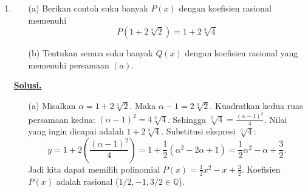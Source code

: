 \documentclass[12pt,twoside]{article}
\newenvironment{solution}
{
	\par\noindent\textbf{\underline{Solusi.}}\\
}
{
	\par
}
\begin{document}
\begin{enumerate}
\begin{solution}
\begin{enumerate}
            \item[(b)] Kita diminta memberi contoh $M, N$ ukuran $3 \times 3$ yang nilai eigennya positif, dan $MN$ juga punya nilai eigen positif.
                  Cara termudah adalah memilih $M$ dan $N$ sebagai matriks diagonal dengan elemen positif.
                  Misal $M = \text{diag}(1, 2, 3)$ dan $N = \text{diag}(4, 5, 6)$.
                  Nilai eigen $M$: $1, 2, 3$ (positif).
                  Nilai eigen $N$: $4, 5, 6$ (positif).
                  $MN = \text{diag}(4, 10, 18)$.
                  Nilai eigen $MN$: $4, 10, 18$ (positif).
                  Contoh non-diagonal (agar tidak trivial):
                  Misalkan $M = I = \begin{pmatrix} 1 & 0 & 0 \\ 0 & 1 & 0 \\ 0 & 0 & 1 \end{pmatrix}$. Nilai eigen 1, 1, 1.
                  Misalkan $N = \begin{pmatrix} 2 & 1 & 0 \\ 0 & 2 & 1 \\ 0 & 0 & 2 \end{pmatrix}$ (Matriks segitiga atas).
                  Nilai eigen $N$ adalah diagonalnya: 2, 2, 2 (positif).
                  Maka $MN = N$. Nilai eigen 2, 2, 2 (positif).
          \end{enumerate}
        \end{solution}

  \item \begin{enumerate}
          \item [(a)] Berikan contoh suku banyak $P(x)$ dengan koefisien rasional memenuhi
                $$P(1+2\sqrt[3]{2})=1+2\sqrt[3]{4}$$
          \item[(b)] Tentukan semua suku banyak $Q(x)$ dengan koefisien rasional yang memenuhi persamaan $(a)$.
        \end{enumerate}
        \begin{solution}
          \begin{enumerate}
            \item[(a)] Misalkan $\alpha = 1 + 2\sqrt[3]{2}$. Maka $\alpha - 1 = 2\sqrt[3]{2}$.
                  Kuadratkan kedua ruas persamaan kedua:
                  $(\alpha-1)^2 = 4 \sqrt[3]{4}$.
                  Sehingga $\sqrt[3]{4} = \frac{(\alpha-1)^2}{4}$.
                  Nilai yang ingin dicapai adalah $1 + 2\sqrt[3]{4}$. Substitusi ekspresi $\sqrt[3]{4}$:
                  $$ y = 1 + 2 \left( \frac{(\alpha-1)^2}{4} \right) = 1 + \frac{1}{2}(\alpha^2 - 2\alpha + 1) = \frac{1}{2}\alpha^2 - \alpha + \frac{3}{2}. $$
                  Jadi kita dapat memilih polinomial $P(x) = \frac{1}{2}x^2 - x + \frac{3}{2}$.
                  Koefisien $P(x)$ adalah rasional ($1/2, -1, 3/2 \in \mathbb{Q}$).


\end{enumerate}
\end{solution}
\end{enumerate}
\end{document}
